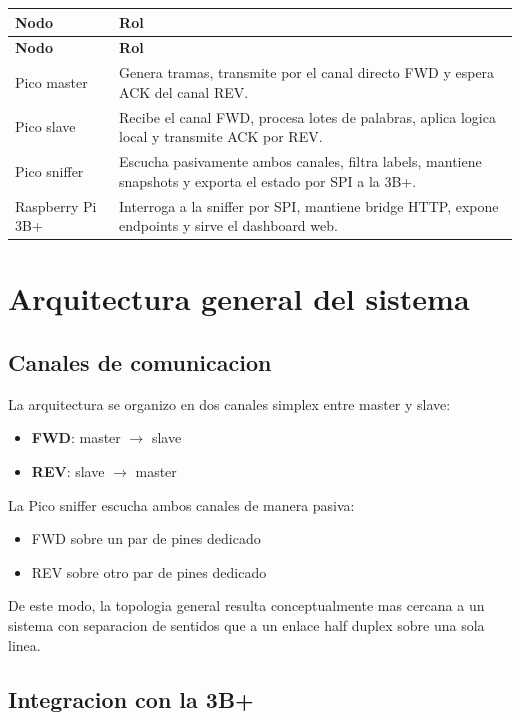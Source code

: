 \documentclass[12pt,a4paper,oneside]{report}
\begin{document}
\begin{longtable}{p{} p{}}
\toprule
\textbf{Nodo} & \textbf{Rol} \\
\midrule
\endfirsthead
\toprule
\textbf{Nodo} & \textbf{Rol} \\
\midrule
\endhead
Pico master & Genera tramas, transmite por el canal directo FWD y espera ACK del canal REV. \\
Pico slave & Recibe el canal FWD, procesa lotes de palabras, aplica logica local y transmite ACK por REV. \\
Pico sniffer & Escucha pasivamente ambos canales, filtra labels, mantiene snapshots y exporta el estado por SPI a la 3B+. \\
Raspberry Pi 3B+ & Interroga a la sniffer por SPI, mantiene bridge HTTP, expone endpoints y sirve el dashboard web. \\
\bottomrule
\end{longtable}

\chapter{Arquitectura general del sistema}

\section{Canales de comunicacion}

La arquitectura se organizo en dos canales simplex entre master y slave:

\begin{itemize}[leftmargin=1.2cm]
    \item \textbf{FWD}: master $\rightarrow$ slave
    \item \textbf{REV}: slave $\rightarrow$ master
\end{itemize}

La Pico sniffer escucha ambos canales de manera pasiva:

\begin{itemize}[leftmargin=1.2cm]
    \item FWD sobre un par de pines dedicado
    \item REV sobre otro par de pines dedicado
\end{itemize}

De este modo, la topologia general resulta conceptualmente mas cercana a un sistema con separacion de sentidos que a un enlace half duplex sobre una sola linea.

\section{Integracion con la 3B+}
\end{document}
